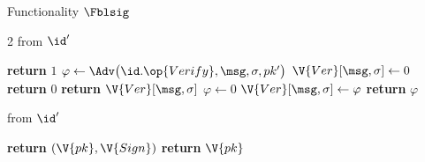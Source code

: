 \begin{interface}[nofloat]{Functionality $\Fblsig$ \\
}
{\begin{multicols}{2}
 \quad from $\id'$
\begin{algorithmic}[1]
\algcont
{}
  \State \textbf{return} $1$ \label{ln:blscomplete}
\EndIf
\State $\varphi \gets \Adv\bigl(\id.\op{Verify}, \msg, \sigma, pk'\bigr)$
  \State $\V{Ver}[\msg, \sigma] \gets 0$ \label{ln:blsunforge}
  \State \textbf{return} $0$
\EndIf
{}
  \State \textbf{return} $\V{Ver}[\msg, \sigma]$ \label{ln:blsconsist}
\EndIf
{}
  \State $\varphi \gets 0$
\EndIf
\State $\V{Ver}[\msg, \sigma] \gets \varphi$
\State \textbf{return} $\varphi$
\algsave
\end{algorithmic}
\vspace{1.4ex}

 \quad from $\id'$
\begin{algorithmic}[1]
\algcont
{}
  \State \textbf{return} $(\V{pk}, \V{Sign})$ \label{ln:blsleakbank}
\EndIf
\State \textbf{return} $\V{pk}$
\algsave
\end{algorithmic}
\end{multicols}}
\end{interface}
